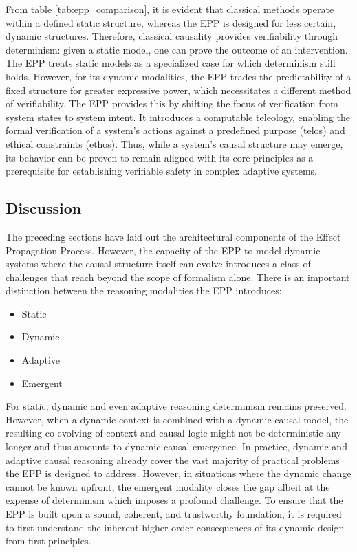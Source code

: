 From table \ref{tab:epp_comparison}, it is evident that classical methods operate within a defined static structure, whereas the EPP is designed for less certain, dynamic structures. Therefore, classical causality provides verifiability through determinism: given a static model, one can prove the outcome of an intervention. The EPP treats static models as a specialized case for which determinism still holds. However, for its dynamic modalities, the EPP trades the predictability of a fixed structure for greater expressive power, which necessitates a different method of verifiability. The EPP provides this by shifting the focus of verification from system states to system intent. It introduces a computable teleology, enabling the formal verification of a system's actions against a predefined purpose (telos) and ethical constraints (ethos). Thus, while a system's causal structure may emerge, its behavior can be proven to remain aligned with its core principles as a prerequisite for establishing verifiable safety in complex adaptive systems.


\subsection{Discussion}
\label{sec:epp_discussion}

The preceding sections have laid out the architectural components of the Effect Propagation Process. However, the capacity of the EPP to model dynamic systems where the causal structure itself can evolve introduces a class of challenges that reach beyond the scope of formalism alone. There is an important distinction between the reasoning modalities the EPP introduces:

\begin{itemize}
	\item Static
	\item Dynamic
	\item Adaptive 
	\item Emergent 
\end{itemize}

For static, dynamic and even adaptive reasoning determinism remains preserved. However, when a dynamic context is combined with a dynamic causal model, the resulting co-evolving of context and causal logic might not be deterministic any longer and thus amounts to dynamic causal emergence. In practice, dynamic and adaptive causal reasoning already cover the vast majority of practical problems the EPP is designed to address. However, in situations where the dynamic change cannot be known upfront, the emergent modality closes the gap albeit at the expense of determinism which imposes a profound challenge. To ensure that the EPP is built upon a sound, coherent, and trustworthy foundation, it is required to first understand the inherent higher-order consequences of its dynamic design from first principles.

